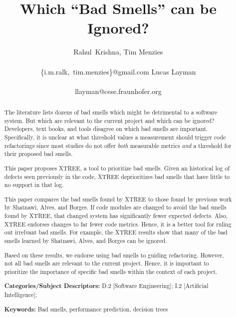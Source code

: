 \documentclass{sig-alternate}
\begin{document}
  


\title{  Which ``Bad Smells'' can be Ignored?}
\author{  
\alignauthor
Rahul~Krishna, Tim Menzies  \\
       \\
       {\{i.m.ralk,~tim.menzies\}@gmail.com}
\alignauthor
Lucas Layman \\
       \\ 
       {llayman@cese.fraunhofer.org}
\setlength{\columnsep}{7mm}}
\maketitle
\begin{abstract} 
The literature lists dozens of bad smells which might
be detrimental to a software system.
But which are relevant to the current project
and which can be ignored?
Developers, text books, and tools
disagree on which bad smells are important. 
Specifically, it is unclear at what threshold values
a measurement should trigger code refactorings  since
most studies do not offer
{\em both} measurable metrics {\em and} a threshold for their proposed bad smells.
 
This paper proposes   XTREE, a tool to  prioritize bad smells. Given an historical
log of defects
seen previously in the code, XTREE
  deprioritizes   bad smells  that have little to no support
  in that log.
  
  This paper compares the bad smells found by XTREE to
  those found by previous work by Shatnawi, Alves, and Borges. 
  If code modules are  changed to avoid the bad
  smells found by XTREE,  that changed system
  has significantly fewer expected defects.
  Also, XTREE   endorses
  changes to far fewer code metrics.
  Hence, it is 
  a better tool for ruling out irrelvant bad smells.
  For example, the XTREE results show that many of the bad smells learned 
  by Shatnawi, Alves, and Borges can be ignored.
   
  
Based on these results, we endorse using bad smells to  
guiding refactoring. However, not all bad smells
are   relevant to the current project.
Hence, it is important
to  prioritize the importance of specific bad smells within the context of each project.

 
{\bf Categories/Subject Descriptors:} D.2 [Software Engineering]; I.2 [Artificial Intelligence];

 
{\bf Keywords:} Bad smells,
performance prediction,  decision trees 
\end{abstract}
\end{document}
